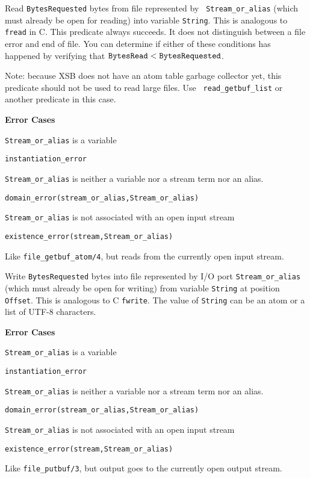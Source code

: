 \begin{description}
Read {\tt BytesRequested} bytes from file represented by {\tt
Stream\_or\_alias} (which must already be open for reading) into
variable {\tt String}. This is analogous to {\tt fread} in C.  This
predicate always succeeds. It does not distinguish between a file
error and end of file.  You can determine if either of these
conditions has happened by verifying that $\tt BytesRead <
BytesRequested$.

Note: because XSB does not have an atom table garbage collector yet,
this predicate should not be used to read large files.  Use {\tt
read\_getbuf\_list} or another predicate in this case.

{\bf Error Cases} 
\bi
\item 	{\tt Stream\_or\_alias} is a variable
\bi
\item {\tt instantiation\_error}
\ei
\item 	{\tt Stream\_or\_alias} is neither a variable nor a stream term nor an alias.
\bi
\item 	{\tt domain\_error(stream\_or\_alias,Stream\_or\_alias)}
\ei
\item 	{\tt Stream\_or\_alias} is not associated with an open input stream
\bi
\item 	{\tt existence\_error(stream,Stream\_or\_alias)}
\ei
\ei

%
Like \verb|file_getbuf_atom/4|, but reads from the currently open input stream.


Write {\tt BytesRequested} bytes into file represented by I/O port
{\tt Stream\_or\_alias} (which must already be open for writing) from
variable {\tt String} at position {\tt Offset}. This is analogous to C
{\tt fwrite}.  The value of {\tt String} can be an atom or a list of
UTF-8 characters.

{\bf Error Cases} 
\bi
\item 	{\tt Stream\_or\_alias} is a variable
\bi
\item {\tt instantiation\_error}
\ei
\item 	{\tt Stream\_or\_alias} is neither a variable nor a stream term nor an alias.
\bi
\item 	{\tt domain\_error(stream\_or\_alias,Stream\_or\_alias)}
\ei
\item 	{\tt Stream\_or\_alias} is not associated with an open input stream
\bi
\item 	{\tt existence\_error(stream,Stream\_or\_alias)}
\ei
\ei

%
Like \verb|file_putbuf/3|, but output goes to the currently open output stream.


\end{description}

